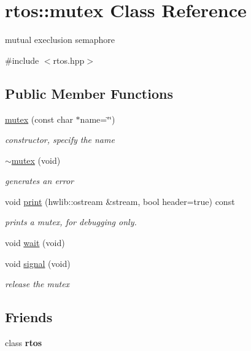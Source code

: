 \hypertarget{classrtos_1_1mutex}{}\section{rtos\+:\+:mutex Class Reference}
\label{classrtos_1_1mutex}


mutual execlusion semaphore  




{\ttfamily \#include $<$rtos.\+hpp$>$}

\subsection*{Public Member Functions}
\begin{DoxyCompactItemize}
\item 
\hyperlink{classrtos_1_1mutex_ac406598aa3b34c199c6d4914de392180}{mutex} (const char $\ast$name=\char`\"{}\char`\"{})
\begin{DoxyCompactList}\small\item\em constructor, specify the name \end{DoxyCompactList}\item 
\hyperlink{classrtos_1_1mutex_a6c0644985543ff72112560edc8d70bb0}{$\sim$mutex} (void)
\begin{DoxyCompactList}\small\item\em generates an error \end{DoxyCompactList}\item 
void \hyperlink{classrtos_1_1mutex_a43b6d7a55176945f59598f825a5acd65}{print} (hwlib\+::ostream \&stream, bool header=true) const \hypertarget{classrtos_1_1mutex_a43b6d7a55176945f59598f825a5acd65}{}\label{classrtos_1_1mutex_a43b6d7a55176945f59598f825a5acd65}

\begin{DoxyCompactList}\small\item\em prints a mutex, for debugging only. \end{DoxyCompactList}\item 
void \hyperlink{classrtos_1_1mutex_af005eb2964192bbdf1a444eab11eb683}{wait} (void)
\item 
void \hyperlink{classrtos_1_1mutex_ad57303013f03da5856e54f331323dc5d}{signal} (void)
\begin{DoxyCompactList}\small\item\em release the mutex \end{DoxyCompactList}\end{DoxyCompactItemize}
\subsection*{Friends}
\begin{DoxyCompactItemize}
\item 
class {\bfseries rtos}\hypertarget{classrtos_1_1mutex_a2a7bcfc34141352757ad672e3ecd099f}{}\label{classrtos_1_1mutex_a2a7bcfc34141352757ad672e3ecd099f}

\end{DoxyCompactItemize}


